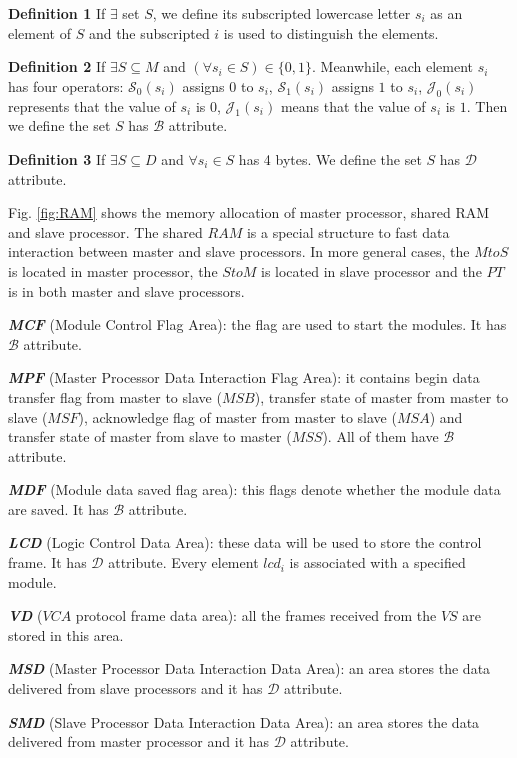 \documentclass[journal,UTF8]{IEEEtran}
\begin{document}
\textbf{Definition 1} If $\exists$ set $S$, we define its subscripted lowercase letter $s_i$ as an element of $S$ and the subscripted $i$ is used to distinguish the elements.

\textbf{Definition 2} If $\exists S \subseteq M$ and $(\forall s_{i} \in S) \in \{0, 1\} $. Meanwhile, each element $s_i$ has four operators: $\mathcal{S}_0(s_i)$ assigns $0$ to $s_i$, $\mathcal{S}_1(s_i)$ assigns $1$ to $s_i$, $\mathcal{J}_0(s_i)$ represents that the value of $s_i$ is $0$, $\mathcal{J}_1(s_i)$ means that the value of $s_i$ is $1$. Then we define the set $S$ has $\mathcal{B}$ attribute.

\textbf{Definition 3} If $\exists S \subseteq D$ and $\forall s_{i} \in S$ has 4 bytes. We define the set $S$ has $\mathcal{D}$ attribute.

Fig. \ref{fig:RAM} shows the memory allocation of master processor, shared RAM and slave processor. The shared $RAM$ is a special structure to fast data interaction between master and slave processors. In more general cases, the $MtoS$ is located in master processor, the $StoM$ is located in slave processor and the $PT$ is in both master and slave processors. 

\textbf{\emph{MCF}} (Module Control Flag Area): the flag are used to start the modules. It has $\mathcal{B}$ attribute.

\textbf{\emph{MPF}} (Master Processor Data Interaction Flag Area): it contains begin data transfer flag from master to slave ($MSB$), transfer state of master from master to slave ($MSF$), acknowledge flag of master from master to slave ($MSA$) and transfer state of master from slave to master ($MSS$). All of them have $\mathcal{B}$ attribute.


\textbf{\emph{MDF}} (Module data saved flag area): this flags denote whether the module data are saved. It has $\mathcal{B}$ attribute.

\textbf{\emph{LCD}} (Logic Control Data Area): these data will be used to store the control frame. It has $\mathcal{D}$ attribute. Every element $lcd_i$ is associated with a specified module.

\textbf{\emph{VD}} ($VCA$ protocol frame data area): all the frames received from the $VS$ are stored in this area.

\textbf{\emph{MSD}} (Master Processor Data Interaction Data Area): an area stores the data delivered from slave processors and it has $\mathcal{D}$ attribute.

\textbf{\emph{SMD}} (Slave Processor Data Interaction Data Area): an area stores the data delivered from master processor and it has $\mathcal{D}$ attribute.
\end{document}
